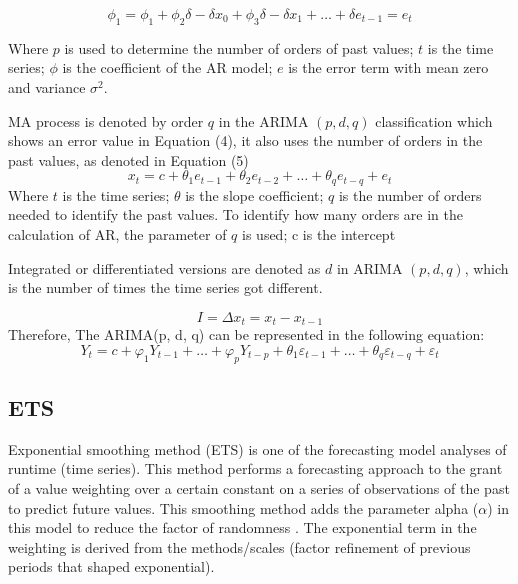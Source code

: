 \documentclass[conference]{IEEEtran}
\begin{document}
\begin{equation}
\phi_1 = \phi_1 + \phi_2 \delta - \delta x_0 + \phi_3 \delta - \delta x_1 + \ldots + \delta e_{t-1} = e_t
\end{equation}

Where $p$ is used to determine the number of orders of past values; $t$ is the time series; $\phi$ is the coefficient of the AR model; $e$ is the error term with mean zero and variance $\sigma^2$.

MA process is denoted by order $q$ in the ARIMA $(p, d, q)$ classification which shows an error value in Equation (4), it also uses the number of orders in the past values, as denoted in Equation (5)
\begin{equation}
x_t = c +\theta_1 e_{t-1} + \theta_2 e_{t-2} + \ldots + \theta_q e_{t-q} + e_t
\end{equation}
Where $t$ is the time series; $\theta$ is the slope coefficient; $q$ is the number of orders needed to identify the past values. To identify how many orders are in the calculation of AR, the parameter of $q$ is used; c is the intercept

Integrated or differentiated versions are denoted as $d$ in ARIMA $(p, d, q)$, which is the number of times the time series got different.

\begin{equation}
I = \Delta x_t = x_t - x_{t-1}
\end{equation}
Therefore, The ARIMA(p, d, q) can be represented in the following equation:
\begin{equation}
    Y_t = c + \varphi_1 Y_{t-1} + \ldots + \varphi_p Y_{t-p} + \theta_1 \varepsilon_{t-1} + \ldots + \theta_q \varepsilon_{t-q} + \varepsilon_t
\end{equation}

\subsection{ETS}
Exponential smoothing method (ETS) is one of the forecasting model analyses of runtime (time series). This method performs a forecasting approach to the grant of a value weighting over a certain constant on a series of observations of the past to predict future values. This smoothing method adds the parameter alpha (\(\alpha\)) in this model to reduce the factor of randomness \cite{b1}. The exponential term in the weighting is derived from the methods/scales (factor refinement of previous periods that shaped exponential).
\end{document}
